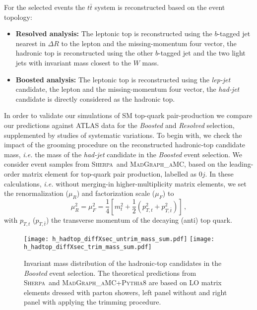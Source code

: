 \documentclass[aps,prd,amsmath,amssymb,superscriptaddress, preprintnumbers,preprint,nofootinbib,a4paper]{revtex4}
\makeatletter
\newcommand{\ttb}{t\bar{t}}
\def\Sherpa{\textsc{Sherpa}}
\def\mg5{\textsc{MadGraph\_aMC\@NLO}}
\makeatother
\begin{document}
For the selected events the $\ttb$ system is reconstructed based on the event topology:
\begin{itemize}
\item \textbf{Resolved analysis:} The leptonic top is reconstructed using the $b$-tagged jet nearest in $\Delta R$ to the lepton
  and the missing-momentum four vector, the hadronic top is reconstructed using the other $b$-tagged jet and the
  two light jets with invariant mass closest to the $W$ mass.
\item \textbf{Boosted analysis:} The leptonic top is reconstructed using the \emph{lep-jet} candidate, the lepton
  and the missing-momentum four vector, the \emph{had-jet} candidate is directly considered as the hadronic top.
\end{itemize}


In order to validate our simulations of SM top-quark pair-production we compare our predictions
against ATLAS data for the \emph{Boosted} and \emph{Resolved} selection, supplemented by studies of systematic
variations. To begin with, we check the impact of the grooming procedure on the reconstructed hadronic-top
candidate mass, \emph{i.e.} the mass of the \emph{had-jet} candidate in the \emph{Boosted} event selection.
We consider event samples from \Sherpa\ and \mg5, based on the leading-order matrix element for top-quark
pair production, labelled as $0j$. In these calculations, \emph{i.e.} without merging-in higher-multiplicity matrix elements,
we set the renormalization ($\mu_R$) and factorization scale ($\mu_F$) to 
\begin{equation}
\mu_R^2=\mu_F^2 = \frac14 [ m_t^2 + \frac12 (p_{T,t}^2 + p_{T,\bar{t}}^2) ]\,,
\end{equation}
%
with $p_{T,t}$ ($p_{T,\bar{t}}$) the transverse momentum of the decaying (anti) top quark.

\begin{figure}[h!]
\texttt{[image: h\_hadtop\_diffXsec\_untrim\_mass\_sum.pdf]}
\texttt{[image: h\_hadtop\_diffXsec\_trim\_mass\_sum.pdf]}
\caption{Invariant mass distribution of the hadronic-top candidates in the \emph{Boosted} event selection.
  The theoretical predictions from \Sherpa\ and \mg5+\textsc{Pythia}8 are based on LO matrix elements
  dressed with parton showers, left panel without and right panel with applying the trimming procedure.}
\label{fig:Trimming}
\end{figure}
\end{document}
